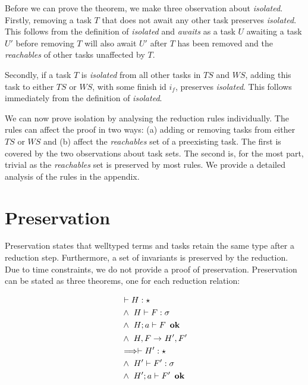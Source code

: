 Before we can prove the theorem, we make three observation about \textit{isolated}. Firstly, removing a task $T$ that does not await any other task preserves \textit{isolated}. This follows from the definition of \textit{isolated} and \textit{awaits} as a task $U$ awaiting a task $U'$ before removing $T$ will also await $U'$ after $T$ has been removed and the \textit{reachables} of other tasks unaffected by $T$.

Secondly, if a task $T$ is \textit{isolated} from all other tasks in $TS$ and $WS$, adding this task to either $TS$ or $WS$, with some finish id $i_f$, preserves \textit{isolated}. This follows immediately from the definition of \textit{isolated}.

We can now prove isolation by analysing the reduction rules individually. The rules can affect the proof in two ways: (a) adding or removing tasks from either $TS$ or $WS$ and (b) affect the \textit{reachables} set of a preexisting task. The first is covered by the two observations about task sets. The second is, for the most part, trivial as the \textit{reachables} set is preserved by most rules. We provide a detailed analysis of the rules in the appendix.

\section{Preservation}
Preservation states that welltyped terms and tasks retain the same type after a reduction step. Furthermore, a set of invariants is preserved by the reduction. Due to time constraints, we do not provide a proof of preservation.
Preservation can be stated as three theorems, one for each reduction relation:

\begin{theorem}
    \begin{alignat}{3}
    & \vdash H : \star \label{pres-prem-1}\\
    &\wedge\ H \vdash F : \sigma \label{pres-prem-2}\\
    &\wedge\ H; a \vdash F\ \bn{ok}\\
    &\wedge\ \reducframe{F}*[H']{F'}*\\
    &\Longrightarrow \vdash H' : \star\\
    &\wedge\ H' \vdash F' : \sigma\\
    &\wedge\ H'; a \vdash F'\ \bn{ok}
    \end{alignat}
\end{theorem}

